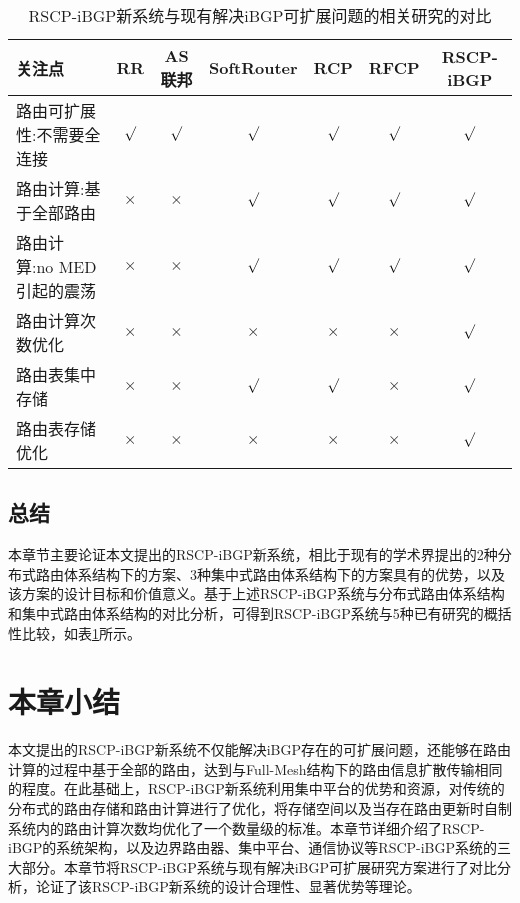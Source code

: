 \begin{table}[h]
	\centering
	\caption{RSCP-iBGP新系统与现有解决iBGP可扩展问题的相关研究的对比}
    \label{tab:compare}
	\begin{tabular}{|l|c|c|c|c|c|c|}
		\hline
		关注点 & RR & AS联邦 & SoftRouter & RCP & RFCP & RSCP-iBGP \\ \hline
		路由可扩展性:不需要全连接 &  $\surd$ &  $\surd$  & $\surd$  &$\surd$ & $\surd$  &$\surd$  \\ \hline
        路由计算:基于全部路由 & $\times$ &  $\times$  & $\surd$  &$\surd$ & $\surd$  &$\surd$  \\ \hline
        路由计算:no MED引起的震荡 &  $\times$ &  $\times$  & $\surd$  &$\surd$ & $\surd$  &$\surd$  \\ \hline
        路由计算次数优化&  $\times$ &  $\times$  & $\times$  &$\times$ & $\times$  &$\surd$  \\ \hline
        路由表集中存储&  $\times$ &  $\times$  & $\surd$  &$\surd$ & $\times$  &$\surd$  \\ \hline
        路由表存储优化&  $\times$ &  $\times$  & $\times$  &$\times$ & $\times$  &$\surd$  \\ \hline
	\end{tabular}
\end{table}

\subsection{总结}

本章节主要论证本文提出的RSCP-iBGP新系统，相比于现有的学术界提出的2种分布式路由体系结构下的方案、3种集中式路由体系结构下的方案具有的优势，以及该方案的设计目标和价值意义。基于上述RSCP-iBGP系统与分布式路由体系结构和集中式路由体系结构的对比分析，可得到RSCP-iBGP系统与5种已有研究的概括性比较，如表\ref{tab:compare}所示。



\section{本章小结}

本文提出的RSCP-iBGP新系统不仅能解决iBGP存在的可扩展问题，还能够在路由计算的过程中基于全部的路由，达到与Full-Mesh结构下的路由信息扩散传输相同的程度。在此基础上，RSCP-iBGP新系统利用集中平台的优势和资源，对传统的分布式的路由存储和路由计算进行了优化，将存储空间以及当存在路由更新时自制系统内的路由计算次数均优化了一个数量级的标准。本章节详细介绍了RSCP-iBGP的系统架构，以及边界路由器、集中平台、通信协议等RSCP-iBGP系统的三大部分。本章节将RSCP-iBGP系统与现有解决iBGP可扩展研究方案进行了对比分析，论证了该RSCP-iBGP新系统的设计合理性、显著优势等理论。

